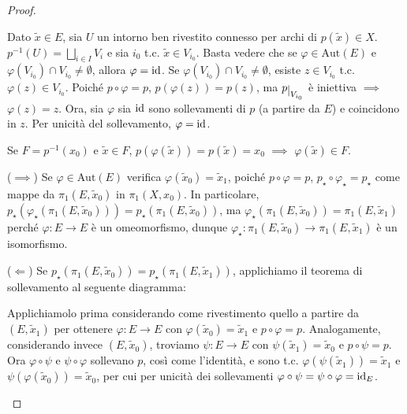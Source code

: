 \begin{proof}
  \begin{nlist}
    \item Dato $\tilde{x} \in E$, sia $U$ un intorno ben rivestito connesso per archi di $p(\tilde{x}) \in X$. $\displaystyle p^{-1}(U)=\bigsqcup_{i \in I} V_i$ e sia $i_0$ t.c. $\tilde{x} \in V_{i_0}$.
    Basta vedere che se $\varphi \in \text{Aut}(E)$ e $\varphi(V_{i_0})\cap V_{i_0} \not=\emptyset$, allora $\varphi=\operatorname{id}$. Se $\varphi(V_{i_0})\cap V_{i_0} \not=\emptyset$, esiste $z \in V_{i_0}$ t.c. $\varphi(z) \in V_{i_0}$.
    Poiché $p \circ \varphi=p$, $p(\varphi(z))=p(z)$, ma $p\restrict{V_{i_0}}$ è iniettiva $\implies$ $\varphi(z)=z$. Ora, sia $\varphi$ sia $\operatorname{id}$ sono sollevamenti di $p$ (a partire da $E$) e coincidono in $z$. Per unicità del sollevamento, $\varphi=\operatorname{id}$.
    \item Se $F=p^{-1}(x_0)$ e $\tilde{x} \in F$, $p(\varphi(\tilde{x}))=p(\tilde{x})=x_0$ $\implies$ $\varphi(\tilde{x}) \in F$.
    \item ($\implies$) Se $\varphi \in \text{Aut}(E)$ verifica $\varphi(\tilde{x}_0)=\tilde{x}_1$, poiché $p \circ \varphi=p$, $p_{\star} \circ \varphi_{\star}=p_{\star}$ come mappe da $\pi_1(E, \tilde{x}_0)$ in $\pi_1(X, x_0)$.
    In particolare, $p_{\star}(\varphi_{\star}(\pi_1(E, \tilde{x}_0)))=p_{\star}(\pi_1(E, \tilde{x}_0))$, ma $\varphi_{\star}(\pi_1(E, \tilde{x}_0))=\pi_1(E, \tilde{x}_1)$ perché $\varphi:E \longrightarrow E$ è un omeomorfismo, dunque $\varphi_{\star}:\pi_1(E, \tilde{x}_0) \longrightarrow \pi_1(E, \tilde{x}_1)$ è un isomorfismo.

    ($\Leftarrow$) Se $p_{\star}(\pi_1(E, \tilde{x}_0))=p_{\star}(\pi_1(E, \tilde{x}_1))$, applichiamo il teorema di sollevamento al seguente diagramma:
    \begin{center}
    \end{center}
    Applichiamolo prima considerando come rivestimento quello a partire da $(E, \tilde{x}_1)$ per ottenere $\varphi:E \longrightarrow E$ con $\varphi(\tilde{x}_0)=\tilde{x}_1$ e $p \circ \varphi=p$. Analogamente, considerando invece $(E, \tilde{x}_0)$, troviamo $\psi:E \longrightarrow E$ con $\psi(\tilde{x}_1)=\tilde{x}_0$ e $p \circ \psi=p$.
    Ora $\varphi \circ \psi$ e $\psi \circ \varphi$ sollevano $p$, così come l'identità, e sono t.c. $\varphi(\psi(\tilde{x}_1))=\tilde{x}_1$ e $\psi(\varphi(\tilde{x}_0))=\tilde{x}_0$, per cui per unicità dei sollevamenti $\varphi \circ \psi=\psi \circ \varphi=\operatorname{id}_E$.
  \end{nlist}
\end{proof}


